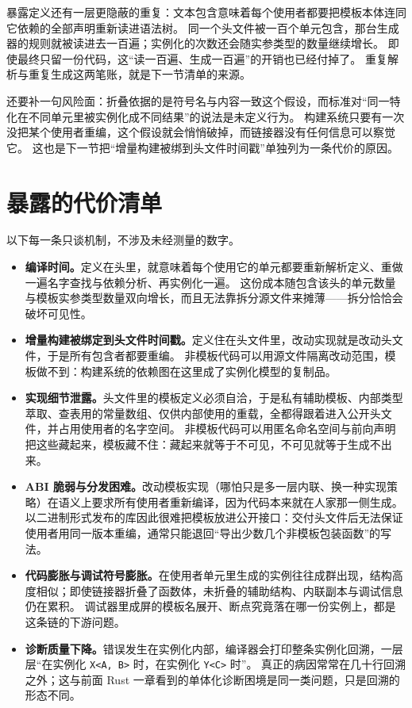 \documentclass[12pt,a4paper,fontset=fandol]{ctexbook}
\newcommand{\kw}[1]{\texttt{#1}}
\begin{document}
暴露定义还有一层更隐蔽的重复：文本包含意味着每个使用者都要把模板本体连同它依赖的全部声明重新读进语法树。
同一个头文件被一百个单元包含，那台生成器的规则就被读进去一百遍；实例化的次数还会随实参类型的数量继续增长。
即使最终只留一份代码，这“读一百遍、生成一百遍”的开销也已经付掉了。
重复解析与重复生成这两笔账，就是下一节清单的来源。

还要补一句风险面：折叠依据的是符号名与内容一致这个假设，而标准对“同一特化在不同单元里被实例化成不同结果”的说法是未定义行为。
构建系统只要有一次没把某个使用者重编，这个假设就会悄悄破掉，而链接器没有任何信息可以察觉它。
这也是下一节把“增量构建被绑到头文件时间戳”单独列为一条代价的原因。

\section{暴露的代价清单}

以下每一条只谈机制，不涉及未经测量的数字。

\begin{itemize}
\item \textbf{编译时间。}定义在头里，就意味着每个使用它的单元都要重新解析定义、重做一遍名字查找与依赖分析、再实例化一遍。
这份成本随包含该头的单元数量与模板实参类型数量双向增长，而且无法靠拆分源文件来摊薄——拆分恰恰会破坏可见性。
\item \textbf{增量构建被绑定到头文件时间戳。}定义住在头文件里，改动实现就是改动头文件，于是所有包含者都要重编。
非模板代码可以用源文件隔离改动范围，模板做不到：构建系统的依赖图在这里成了实例化模型的复制品。
\item \textbf{实现细节泄露。}头文件里的模板定义必须自洽，于是私有辅助模板、内部类型萃取、查表用的常量数组、仅供内部使用的重载，全都得跟着进入公开头文件，并占用使用者的名字空间。
非模板代码可以用匿名命名空间与前向声明把这些藏起来，模板藏不住：藏起来就等于不可见，不可见就等于生成不出来。
\item \textbf{ABI 脆弱与分发困难。}改动模板实现（哪怕只是多一层内联、换一种实现策略）在语义上要求所有使用者重新编译，因为代码本来就在人家那一侧生成。
以二进制形式发布的库因此很难把模板放进公开接口：交付头文件后无法保证使用者用同一版本重编，通常只能退回“导出少数几个非模板包装函数”的写法。
\item \textbf{代码膨胀与调试符号膨胀。}在使用者单元里生成的实例往往成群出现，结构高度相似；即使链接器折叠了函数体，未折叠的辅助结构、内联副本与调试信息仍在累积。
调试器里成屏的模板名展开、断点究竟落在哪一份实例上，都是这条链的下游问题。
\item \textbf{诊断质量下降。}错误发生在实例化内部，编译器会打印整条实例化回溯，一层层“在实例化 \kw{X<A, B>} 时，在实例化 \kw{Y<C>} 时”。
真正的病因常常在几十行回溯之外；这与前面 Rust 一章看到的单体化诊断困境是同一类问题，只是回溯的形态不同。
\end{itemize}
\end{document}

